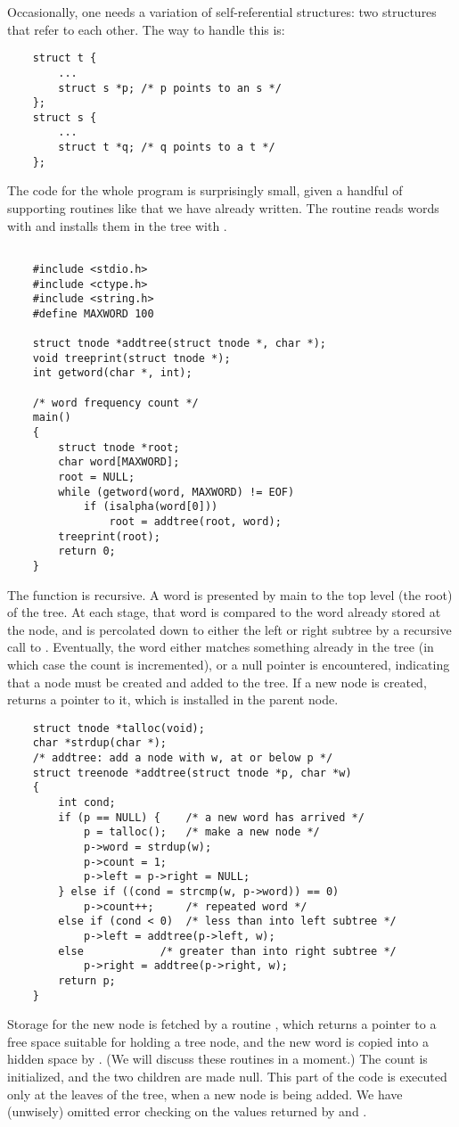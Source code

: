 Occasionally, one needs a variation of self-referential structures: two structures that refer to each other.
The way to handle this is:
\begin{lstlisting}
	struct t {
		...
		struct s *p; /* p points to an s */
	};
	struct s {
		...
		struct t *q; /* q points to a t */
	};
\end{lstlisting}
The code for the whole program is surprisingly small, given a handful of supporting routines like  that we have already written.
The  routine reads words with  and installs them in the tree with .
\begin{lstlisting}

	#include <stdio.h>
	#include <ctype.h>
	#include <string.h>
	#define MAXWORD 100

	struct tnode *addtree(struct tnode *, char *);
	void treeprint(struct tnode *);
	int getword(char *, int);

	/* word frequency count */
	main()
	{
		struct tnode *root;
		char word[MAXWORD];
		root = NULL;
		while (getword(word, MAXWORD) != EOF)
			if (isalpha(word[0]))
				root = addtree(root, word);
		treeprint(root);
		return 0;
	}
\end{lstlisting}
The function  is recursive. A word is presented by main to the top level (the root) of the tree.
At each stage, that word is compared to the word already stored at the node, and is percolated down to either the left or right subtree by a recursive call to .
Eventually, the word either matches something already in the tree (in which case the count is incremented), or a null pointer is encountered, indicating that a node must be created and added to the tree.
If a new node is created,  returns a pointer to it, which is installed in the parent node.

\begin{lstlisting}
	struct tnode *talloc(void);
	char *strdup(char *);
	/* addtree: add a node with w, at or below p */
	struct treenode *addtree(struct tnode *p, char *w)
	{
		int cond;
		if (p == NULL) { 	/* a new word has arrived */
			p = talloc(); 	/* make a new node */
			p->word = strdup(w);
			p->count = 1;
			p->left = p->right = NULL;
		} else if ((cond = strcmp(w, p->word)) == 0)
			p->count++; 	/* repeated word */
		else if (cond < 0) 	/* less than into left subtree */
			p->left = addtree(p->left, w);
		else 			/* greater than into right subtree */
			p->right = addtree(p->right, w);
		return p;
	}
\end{lstlisting}
Storage for the new node is fetched by a routine , which returns a pointer to a free space suitable for holding a tree node, and the new word is copied into a hidden space by .
(We will discuss these routines in a moment.)
The count is initialized, and the two children are made null.
This part of the code is executed only at the leaves of the tree, when a new node is being added.
We have (unwisely) omitted error checking on the values returned by  and .

